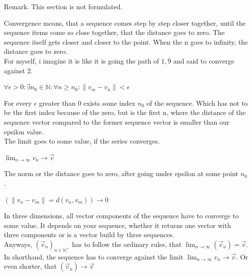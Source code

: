 \documentclass[a4paper]{article}
\begin{document}
Remark. This section is not formulated.

Convergence means, that a sequence comes step by step closer together, until the sequence items come so close together, that the distance goes to zero. The sequence itself gets closer and closer to the point. When the n goes to infinity, the distance goes to zero.\\

For myself, i imagine it is like it is going the path of $1,\bar{9}$ and said to converge against $2$.\\

\begin{center}
$\forall \epsilon > 0 : \exists n_{0} \in \mathbb{N} : \forall n \geq n_{0} : \|v_{m}-v_{n}\| < \epsilon$
\end{center}

For every $\epsilon$ greater than 0 exists some index $n_{0}$ of the sequence. Which has not to be the first index because of the zero,
but is the first n, where the distance of the sequence vector compared to the former sequence vector is smaller than our epsilon value.\\

The limit goes to some value, if the series converges.\\

\begin{center}
$\lim\nolimits_{n\rightarrow\infty} v_{n} \rightarrow \vec{v}$\\
\end{center}

The norm or the distance goes to zero, after going under epsilon at some point $n_{0}$.

\begin{center}
$(\|v_{n}-v_{m}\| = d(v_{n},v_{m})) \rightarrow 0$
\end{center}


In three dimensions, all vector components of the sequence have to converge to some value. It depends on your sequence, whether it returns one vector with three components or is a vector build by three sequences.\\

 Anyways, $(\vec{v}_{n})_{n \in \mathbb{N}^{+} }$ has to follow the ordinary rules, that $\lim_{n\rightarrow\infty}(\vec{v}_{n}) = \vec{v}$. In shorthand, the sequence has to converge against the limit $\lim_{n\rightarrow\infty}v_{n}\rightarrow\vec{v}$. Or even shorter, that $(\vec{v}_{n}) \rightarrow \vec{v}$\\
\end{document}
